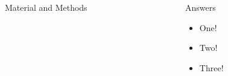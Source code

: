 \documentclass[blue, headsep]{subdocuments/open_science_poster}\usepackage{graphicx, color}
\begin{document}
\begin{frame}[t]
\begin{columns}[t]
\begin{column}{0.28\paperwidth}
			\begin{block}{Material and Methods}
				\lipsum[2]


			\end{block}

		\end{column}


		\begin{column}{0.28\paperwidth}

			\begin{alertblock}{Answers}
				\begin{itemize}
					\item One!
					\item Two!
					\item Three!
				\end{itemize}
			\end{alertblock}

			\begin{exampleblock}{}
				\lipsum[2-3]	
			\end{exampleblock}

		\end{column}  


	\end{columns}
\end{frame}
\end{document}
